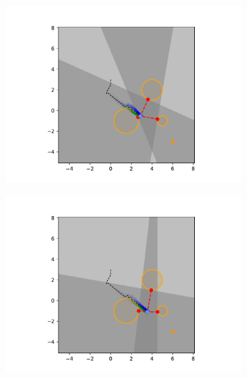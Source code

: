 \begin{figure}[H]
    \begin{subfigure}{0.20\textwidth}
        \centering
        \includegraphics[width=\textwidth]{figures/Simulations/sim1circles/frame_5.pdf}
    \end{subfigure}%
    \hfill
    \begin{subfigure}{0.20\textwidth}
        \centering
        \includegraphics[width=\textwidth]{figures/Simulations/sim1circles/frame_6.pdf}
    \end{subfigure}%
    \hfill
    \begin{subfigure}{0.20\textwidth}
        \centering

\end{subfigure}
\end{figure}
